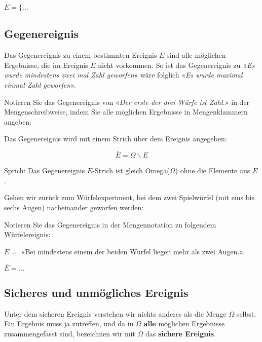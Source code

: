 $E = \{ ...$

\newpage
\subsection{Gegenereignis}
Das Gegenereignis zu einem bestimmten Ereignis $E$ sind alle möglichen Ergebnisse,
die im Ereignis $E$ nicht vorkommen.
So ist das Gegenereignis zu «\textit{Es wurde mindestens zwei mal Zahl
geworfen}» wäre folglich «\textit{Es wurde maximal einmal Zahl
  geworfen}».

Notieren Sie das Gegenereignis von «\textit{Der erste der drei Würfe
  ist Zahl.}» in der Mengenschreibweise, indem Sie alle
möglichen Ergebnisse in Mengenklammern angeben:



\begin{definition}{}{}
Das Gegenereignis wird mit einem Strich über dem Ereignis angegeben:

$$\bar{E} = \Omega \backslash E$$
\end{definition}

Sprich: Das Gegenereignis $E$-Strich ist gleich Omega($\Omega$) ohne die Elemente
aus $E$.

Gehen wir zurück zum Würfelexperiment, bei dem zwei Spielwürfel (mit
eins bis sechs Augen) nacheinander geworfen werden:

Notieren Sie das Gegenereignis in der Mengennotation zu folgendem
Würfelereignis:

$E=$ «Bei mindestens einem der beiden Würfel liegen
mehr als zwei Augen.».

$\bar{E} = ...$



\subsection{Sicheres und unmögliches Ereignis}
Unter dem sicheren Ereignis verstehen wir nichts anderes als die Menge
$\Omega$ selbst. Ein Ergebnis muss ja zutreffen, und da in $\Omega$
\textbf{alle} möglichen Ergebnisse zusammengefasst sind, bezeichnen
wir mit $\Omega$ das \textbf{sichere Ereignis}.


